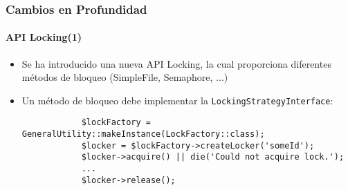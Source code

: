 \begin{frame}[fragile]
	\frametitle{Cambios en Profundidad}
	\framesubtitle{API Locking(1)}

	\begin{itemize}

		\item Se ha introducido una nueva API Locking, la cual proporciona diferentes métodos de bloqueo (SimpleFile, Semaphore, ...)
		\item Un método de bloqueo debe implementar la \small\texttt{LockingStrategyInterface}\normalsize:
		\begin{lstlisting}
			$lockFactory = GeneralUtility::makeInstance(LockFactory::class);
			$locker = $lockFactory->createLocker('someId');
			$locker->acquire() || die('Could not acquire lock.');
			...
			$locker->release();
		\end{lstlisting}

	\end{itemize}

\end{frame}

